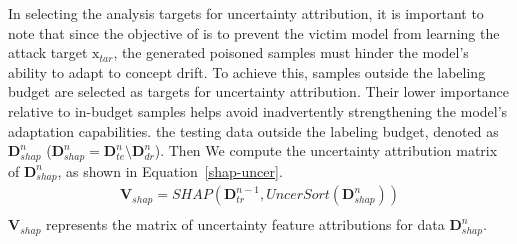 In selecting the analysis targets for uncertainty attribution, it is important to note that since the objective of \pandora is to prevent the victim model from learning the attack target  $\bm{\mathrm{x}}_{tar}$, the generated poisoned samples must hinder the model’s ability to adapt to concept drift.
To achieve this, samples outside the labeling budget are selected as targets for uncertainty attribution.
Their lower importance relative to in-budget samples helps avoid inadvertently strengthening the model’s adaptation capabilities.
the testing data outside the labeling budget, denoted as $\bm{D}_{shap}^{n}$ ($\bm{D}_{shap}^{n} = \bm{D}_{te}^{n} \setminus \bm{D}_{dr}^{n}$).
Then We compute the uncertainty attribution matrix of $\bm{D}_{shap}^{n}$, as shown in Equation~\ref{shap-uncer}.
\begin{equation}
	\begin{aligned}
		\bm{V}_{shap} = SHAP (\bm{D}_{tr}^{n-1},UncerSort(\bm{D}_{shap}^{n})) \\
	\end{aligned}
	\label{shap-uncer}
\end{equation}
$\bm{V}_{shap}$ represents the matrix of uncertainty feature attributions for data $\bm{D}_{shap}^{n}$.
